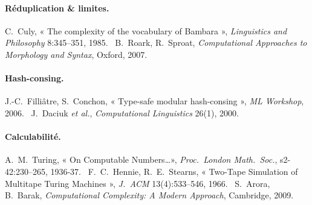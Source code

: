 \documentclass[11pt,a4paper]{scrartcl}
\begin{document}
\paragraph{Réduplication \& limites.} C.~Culy, « The complexity of the vocabulary of
Bambara », \emph{Linguistics and Philosophy} 8:345–351, 1985. \textbullet\ B.~Roark,
R.~Sproat, \emph{Computational Approaches to Morphology and Syntax}, Oxford, 2007.

\paragraph{Hash-consing.} J.-C.~Filliâtre, S.~Conchon, « Type-safe modular hash-consing »,
\emph{ML Workshop}, 2006. \textbullet\ J.~Daciuk \emph{et al.}, \emph{Computational
Linguistics} 26(1), 2000.

\paragraph{Calculabilité.} A.~M.~Turing, « On Computable Numbers\dots », \emph{Proc.\
London Math.\ Soc.}, s2-42:230–265, 1936-37. \textbullet\ F.~C.~Hennie, R.~E.~Stearns,
« Two-Tape Simulation of Multitape Turing Machines », \emph{J.\ ACM} 13(4):533–546, 1966.
\textbullet\ S.~Arora, B.~Barak, \emph{Computational Complexity: A Modern Approach},
Cambridge, 2009.
\end{document}
